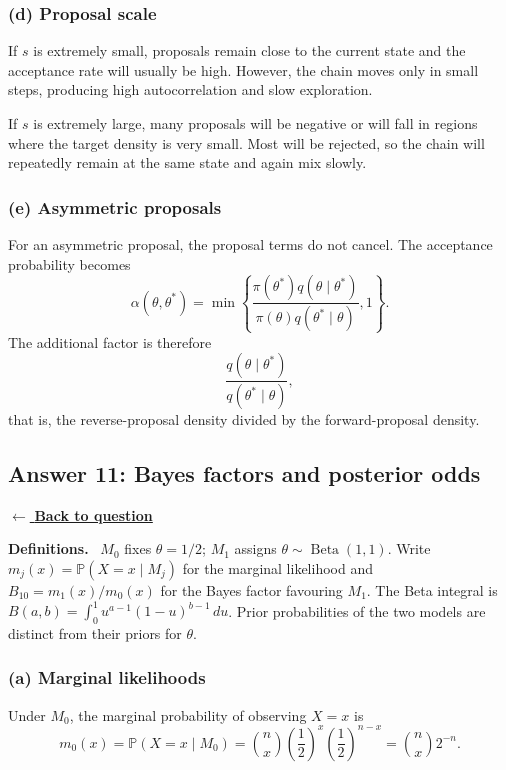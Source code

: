 \documentclass[11pt,a4paper]{article}
\newcommand{\given}{\mathrel{|}}
\newcommand{\answernav}[1]{%
  \label{answer:#1}%
  \noindent\hyperref[question:#1]{$\leftarrow$ \textbf{Back to question}}%
  \par\smallskip}
\newcommand{\studyheading}[1]{%
  \par\medskip\noindent\textcolor{statblue}{\textbf{#1.}}\ }
\begin{document}
\subsubsection*{(d) Proposal scale}

If \(s\) is extremely small, proposals remain close to the current state and
the acceptance rate will usually be high. However, the chain moves only in
small steps, producing high autocorrelation and slow exploration.

If \(s\) is extremely large, many proposals will be negative or will fall in
regions where the target density is very small. Most will be rejected, so the
chain will repeatedly remain at the same state and again mix slowly.

\subsubsection*{(e) Asymmetric proposals}

For an asymmetric proposal, the proposal terms do not cancel. The acceptance
probability becomes
\[
\boxed{
\alpha(\theta,\theta^*)
=
\min\left\{
\frac{\pi(\theta^*)q(\theta\mid\theta^*)}
{\pi(\theta)q(\theta^*\mid\theta)},
1
\right\}.
}
\]
The additional factor is therefore
\[
\boxed{
\frac{q(\theta\mid\theta^*)}{q(\theta^*\mid\theta)},
}
\]
that is, the reverse-proposal density divided by the forward-proposal density.

\clearpage

\subsection{Answer 11: Bayes factors and posterior odds}
\answernav{11}

\studyheading{Definitions}
$M_0$ fixes $\theta=1/2$; $M_1$ assigns $\theta\sim\operatorname{Beta}(1,1)$.
Write $m_j(x)=\mathbb P(X=x\given M_j)$ for the marginal likelihood and $B_{10}=m_1(x)/m_0(x)$ for the Bayes factor favouring $M_1$.
The Beta integral is $B(a,b)=\int_0^1u^{a-1}(1-u)^{b-1}\,du$.
Prior probabilities of the two models are distinct from their priors for $\theta$.

\subsubsection*{(a) Marginal likelihoods}

Under \(M_0\), the marginal probability of observing \(X=x\) is
\[
m_0(x)
=
\mathbb{P}(X=x\mid M_0)
=
\binom{n}{x}\left(\frac12\right)^x
\left(\frac12\right)^{n-x}
=
\boxed{\binom{n}{x}2^{-n}}.
\]
\end{document}
